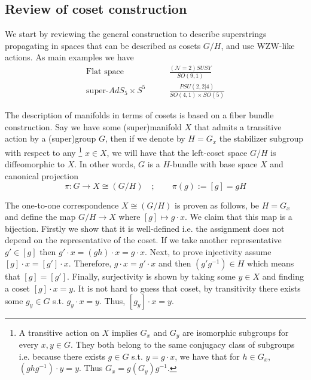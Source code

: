\documentclass[a4paper,12pt]{article}
\numberwithin{equation}{section}
\numberwithin{thm}{section}
\numberwithin{exm}{section}
\newcommand{\lra}{\longrightarrow}
\newcommand{\mo}{^{-1}}
\newcommand{\ads}{{AdS_5\times S^5}}
\newcommand{\<}{{\langle}}
\renewcommand{\>}{{\rangle}}
\newcommand{\mc}{\mathcal}
\begin{document}
\subsection{Review of coset construction}
We start by reviewing the general construction to describe superstrings propagating in spaces that can be described as cosets $G/H$, and use WZW-like actions. As main examples we have
	\begin{align}
	\text{Flat space} &\qquad \frac{(\mc N=2) SUSY}{SO(9,1)} \\
	\text{super-}\ads &\qquad \frac{PSU(2,2|4)}{SO(4,1)\times SO(5)}
	\end{align}

The description of manifolds in terms of cosets is based on a fiber bundle construction. Say we have some (super)manifold $X$ that admits a transitive action by a (super)group $G$, then if we denote by $H = G_x$ the stabilizer subgroup with respect to any%
\footnote{A transitive action on $X$ implies $G_x$ and $G_y$ are isomorphic subgroups for every $x,y\in G$. They both belong to the same conjugacy class of subgroups i.e. because there exists $g\in G$ s.t. $y = g\cdot x$, we have that for $h\in G_x$, $(ghg\mo) \cdot y = y$. Thus $G_x = g(G_y)g\mo$.}
$x\in X$, we will have that the left-coset space $G/H$ is diffeomorphic to $X$. In other words, $G$ is a $H$-bundle with base space $X$ and canonical projection
	\begin{equation}
	\pi: G\lra X\cong (G/H)\quad;\qquad \pi(g) := [g] = gH
	\end{equation}

The one-to-one correspondence $X\cong (G/H)$ is proven as follows, be $H = G_x$ and define the map $G/H \rightarrow X$ where $[g]\mapsto g\cdot x$. We claim that this map is a bijection. Firstly we show that it is well-defined i.e. the assignment does not depend on the representative of the coset. If we take another representative $g'\in [g]$ then $g'\cdot x = (gh)\cdot x = g\cdot x$. Next, to prove injectivity assume $[g]\cdot x = [g']\cdot x$. Therefore, $g\cdot x = g'\cdot x$ and then $(g'g\mo)\in H$ which means that $[g]=[g']$. Finally, surjectivity  is shown by taking some $y\in X$ and finding a coset $[g]\cdot x = y$. It is not hard to guess that coset, by transitivity there exists some $g_y\in G$ s.t. $g_y\cdot x = y$. Thus, $[g_y]\cdot x = y$.
\end{document}
